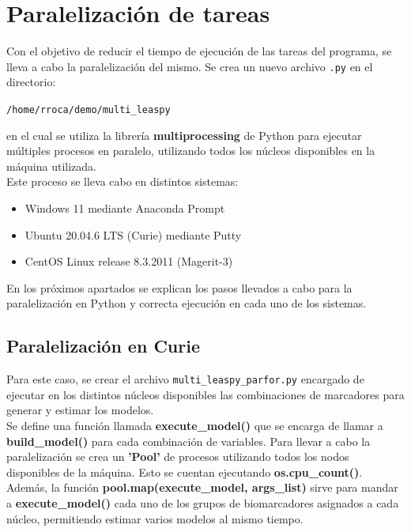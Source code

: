 \section{Paralelización de tareas}
Con el objetivo de reducir el tiempo de ejecución de las tareas del programa, se lleva a cabo la paralelización del mismo. Se crea un nuevo archivo \texttt{.py} en el directorio:
\begin{center}
	\texttt{/home/rroca/demo/multi\_leaspy}
\end{center}
en el cual se utiliza la librería \textbf{multiprocessing} de Python para ejecutar múltiples procesos en paralelo, utilizando todos los núcleos disponibles en la máquina utilizada.\\

Este proceso se lleva cabo en distintos sistemas:
\begin{itemize}
	\item Windows 11 mediante Anaconda Prompt
	\item Ubuntu 20.04.6 LTS (Curie) mediante Putty
	\item CentOS Linux release 8.3.2011 (Magerit-3)
\end{itemize}
 
En los próximos apartados se explican los pasos llevados a cabo para la paralelización en Python y correcta ejecución en cada uno de los sistemas.

\subsection{Paralelización en Curie}
Para este caso, se crear el archivo \texttt{multi\_leaspy\_parfor.py} encargado de ejecutar en los distintos núcleos disponibles las combinaciones de marcadores para generar y estimar los modelos. \\

Se define una función llamada \textbf{execute\_model()} que se encarga de llamar a \textbf{build\_model()} para cada combinación de variables. Para llevar a cabo la paralelización se crea un \textbf{'Pool'} de procesos utilizando todos los nodos disponibles de la máquina. Esto se cuentan ejecutando \textbf{os.cpu\_count()}. Además, la función \textbf{pool.map(execute\_model, args\_list)} sirve para mandar a \textbf{execute\_model()} cada uno de los grupos de biomarcadores asignados a cada núcleo, permitiendo estimar varios modelos al mismo tiempo.\\

